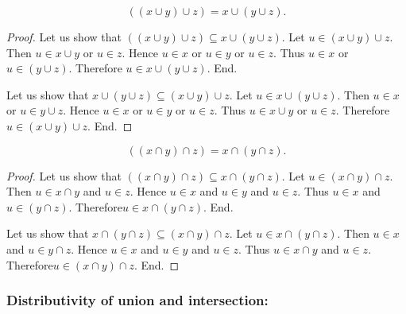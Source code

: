 \documentclass[../../set-theory.ftl.tex]{subfiles}
\begin{document}
  \begin{forthel}
    \begin{proposition}\label{SetTheory_01_01_665069}
      \[ ((x \cup y) \cup z) = x \cup (y \cup z). \]
    \end{proposition}
    \begin{proof}
      Let us show that $((x \cup y) \cup z) \subseteq x \cup (y \cup z)$.
        Let $u \in (x \cup y) \cup z$.
        Then $u \in x \cup y$ or $u \in z$.
        Hence $u \in x$ or $u \in y$ or $u \in z$.
        Thus $u \in x$ or $u \in (y \cup z)$.
        Therefore $u \in x \cup (y \cup z)$.
      End.

      Let us show that $x \cup (y \cup z) \subseteq (x \cup y) \cup z$.
        Let $u \in x \cup (y \cup z)$.
        Then $u \in x$ or $u \in y \cup z$.
        Hence $u \in x$ or $u \in y$ or $u \in z$.
        Thus $u \in x \cup y$ or $u \in z$.
        Therefore $u \in (x \cup y) \cup z$.
      End.
    \end{proof}

    \begin{proposition}\label{SetTheory_01_01_368359}
      \[ ((x \cap y) \cap z) = x \cap (y \cap z). \]
    \end{proposition}
    \begin{proof}
      Let us show that $((x \cap y) \cap z) \subseteq x \cap (y \cap z)$.
        Let $u \in (x \cap y) \cap z$.
        Then $u \in x \cap y$ and $u \in z$.
        Hence $u \in x$ and $u \in y$ and $u \in z$.
        Thus $u \in x$ and $u \in (y \cap z)$.
        Therefore$ u \in x \cap (y \cap z)$.
      End.

      Let us show that $x \cap (y \cap z) \subseteq (x \cap y) \cap z$.
        Let $u \in x \cap (y \cap z)$.
        Then $u \in x$ and $u \in y \cap z$.
        Hence $u \in x$ and $u \in y$ and $u \in z$.
        Thus $u \in x \cap y$ and $u \in z$.
        Therefore$ u \in (x \cap y) \cap z$.
      End.
    \end{proof}
  \end{forthel}


  \subsubsection*{Distributivity of union and intersection:}
\end{document}
